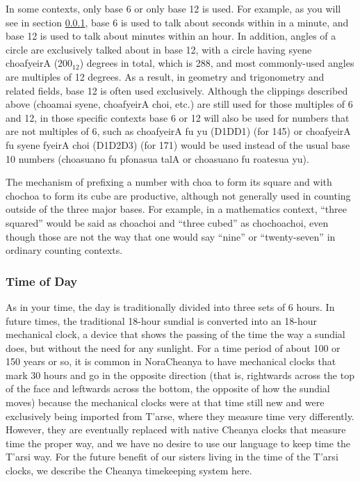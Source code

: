 \documentclass{article}
\begin{document}
In some contexts, only base 6 or only base 12 is used.  For example, as you will see in section \ref{time}, base 6 is used to talk about seconds within in a minute, and base 12 is used to talk about minutes within an hour.  In addition, angles of a circle are exclusively talked about in base 12, with a circle having {\quch syene choafyeirA} (200$_{12}$) degrees in total, which is 288, and most commonly-used angles are multiples of 12 degrees.  As a result, in geometry and trigonometry and related fields, base 12 is often used exclusively.  Although the clippings described above ({\quch choamai syene}, {\quch choafyeirA choi}, etc.) are still used for those multiples of 6 and 12, in those specific contexts base 6 or 12 will also be used for numbers that are not multiples of 6, such as {\quch choafyeirA fu yu} ({\quch D1DD1}) (for 145) or {\quch choafyeirA fu syene fyeirA choi} ({\quch D1D2D3}) (for 171) would be used instead of the usual base 10 numbers ({\quch choasuano fu pfonasua talA} or {\quch choasuano fu roatesua yu}).

The mechanism of prefixing a number with {\quch choa} to form its square and with {\quch chochoa} to form its cube are productive, although not generally used in counting outside of the three major bases.  For example, in a mathematics context, ``three squared'' would be said as {\quch choachoi} and ``three cubed'' as {\quch chochoachoi}, even though those are not the way that one would say ``nine'' or ``twenty-seven'' in ordinary counting contexts.

\subsubsection{Time of Day}
\label{time}

As in your time, the day is traditionally divided into three sets of 6 hours.  In future times, the traditional 18-hour sundial is converted into an 18-hour mechanical clock, a device that shows the passing of the time the way a sundial does, but without the need for any sunlight.  For a time period of about 100 or 150 years or so, it is common in NoraCheanya to have mechanical clocks that mark 30 hours and go in the opposite direction (that is, rightwards across the top of the face and leftwards across the bottom, the opposite of how the sundial moves) because the mechanical clocks were at that time still new and were exclusively being imported from T'arse, where they measure time very differently.  However, they are eventually replaced with native Cheanya clocks that measure time the proper way, and we have no desire to use our language to keep time the T'arsi way.  For the future benefit of our sisters living in the time of the T'arsi clocks, we describe the Cheanya timekeeping system here.
\end{document}
